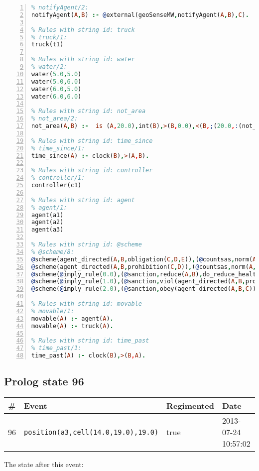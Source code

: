 \documentclass[11pt]{article}\usepackage[utf8]{inputenc}\usepackage{geometry}
\begin{document}
\begin{lstlisting}[language=Prolog, numbers=left]
% Rules with string id: notifyAgent
% notifyAgent/2:
notifyAgent(A,B) :- @external(geoSenseMW,notifyAgent(A,B),C).

% Rules with string id: truck
% truck/1:
truck(t1)

% Rules with string id: water
% water/2:
water(5.0,5.0)
water(5.0,6.0)
water(6.0,5.0)
water(6.0,6.0)

% Rules with string id: not_area
% not_area/2:
not_area(A,B) :-  is (A,20.0),int(B),>(B,0.0),<(B,;(20.0,:(not_area(A,B), is (-(B),20.0)))),int(A),>(A,0.0),<(A,;(20.0,:(area(A,B),-(int(A))))),int(B),>(A,0.0),>(B,0.0),<(A,21.0),<(B,21.0).

% Rules with string id: time_since
% time_since/1:
time_since(A) :- clock(B),>(A,B).

% Rules with string id: controller
% controller/1:
controller(c1)

% Rules with string id: agent
% agent/1:
agent(a1)
agent(a2)
agent(a3)

% Rules with string id: @scheme
% @scheme/8:
@scheme(agent_directed(A,B,obligation(C,D,E)),(@countsas,norm(A,B,F,obligation(C,D,E)),F),false,(listTrue(C)),(time_past(D)),false,[plus(viol(agent_directed(A,B,obligation(C,D,E))))|[]],[plus(obey(agent_directed(A,B,obligation(C,D,E))))|[]])
@scheme(agent_directed(A,B,prohibition(C,D)),(@countsas,norm(A,B,E,prohibition(C,D)),E),(listTrue(C)),false,(false),false,[plus(viol(agent_directed(A,B,prohibition(C,D))))|[]],[plus(obey(agent_directed(A,B,prohibition(C,D))))|[]])
@scheme(@imply_rule(0.0),(@sanction,reduce(A,B),do_reduce_health(A,B),notifyAgent(A,changed(status))),true,false,false,false,[min(reduce(A,B))|[]],[])
@scheme(@imply_rule(1.0),(@sanction,viol(agent_directed(A,B,prohibition(C,D))),do_sanction(D)),true,false,false,false,[min(viol(agent_directed(A,B,prohibition(C,D))))|[]],[])
@scheme(@imply_rule(2.0),(@sanction,obey(agent_directed(A,B,C))),true,false,false,false,[min(obey(agent_directed(A,B,C)))|[]],[])

% Rules with string id: movable
% movable/1:
movable(A) :- agent(A).
movable(A) :- truck(A).

% Rules with string id: time_past
% time_past/1:
time_past(A) :- clock(B),>(B,A).

\end{lstlisting}
\clearpage 
\subsection{Prolog state 96}
\begin{table}[ht]
\centering 
\begin{tabular}{l l l l} 
\textbf{\#} & \textbf{Event} & \textbf{Regimented} & \textbf{Date} \\ [0.5ex] 
\hline
96&\texttt{position(a3,cell(14.0,19.0),19.0)}&true&2013-07-24 10:57:02\\ [1ex] \hline\end{tabular}
\end{table}
The state after this event:
\end{document}

